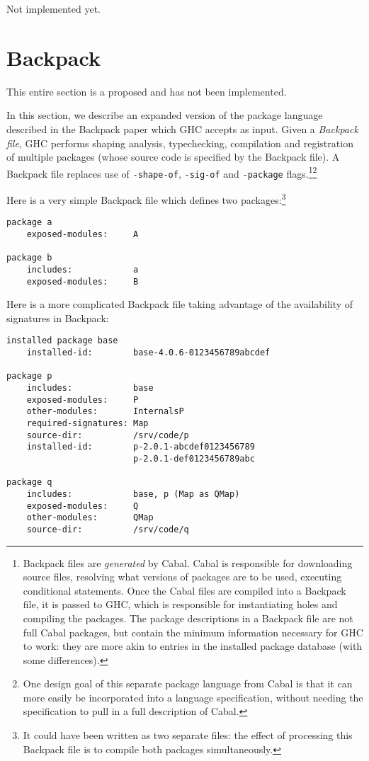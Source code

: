\documentclass{article}
\newcommand{\Red}[1]{{\color{red} #1}}
\begin{document}
\Red{Not implemented yet.}

\section{Backpack}

\Red{This entire section is a proposed and has not been implemented.}

In this section, we describe an expanded version of the package language
described in the Backpack paper which GHC accepts as input.  Given a
\emph{Backpack file}, GHC performs shaping analysis, typechecking,
compilation and registration of multiple packages (whose source code is
specified by the Backpack file).  A Backpack file replaces use of
\texttt{-shape-of}, \texttt{-sig-of} and \texttt{-package} flags.\footnote{Backpack files are \emph{generated} by Cabal.  Cabal is responsible for downloading source files, resolving what versions of packages are to be used, executing conditional statements.  Once the Cabal files are compiled into a Backpack file, it is passed to GHC, which is responsible for instantiating holes and compiling the packages.  The package descriptions in a Backpack file are not full Cabal packages, but contain the minimum information necessary for GHC to work: they are more akin to entries in the installed package database (with some differences).}\footnote{One design goal of this separate package language from Cabal is that it can more easily be incorporated into a language specification, without needing the specification to pull in a full description of Cabal.}

Here is a very simple Backpack file which defines two packages:\footnote{It could have been written as two separate files: the effect of processing this Backpack file is to compile both packages simultaneously.}

\begin{verbatim}
package a
    exposed-modules:     A

package b
    includes:            a
    exposed-modules:     B
\end{verbatim}

Here is a more complicated Backpack file taking advantage of the availability
of signatures in Backpack:

\begin{verbatim}
installed package base
    installed-id:        base-4.0.6-0123456789abcdef

package p
    includes:            base
    exposed-modules:     P
    other-modules:       InternalsP
    required-signatures: Map
    source-dir:          /srv/code/p
    installed-id:        p-2.0.1-abcdef0123456789
                         p-2.0.1-def0123456789abc

package q
    includes:            base, p (Map as QMap)
    exposed-modules:     Q
    other-modules:       QMap
    source-dir:          /srv/code/q
\end{verbatim}
\end{document}
